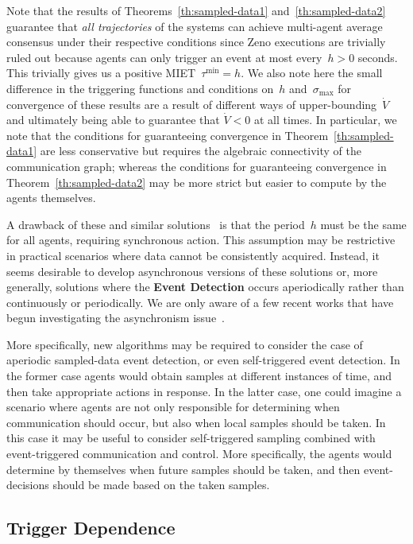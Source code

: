 \documentclass{autart}
\newcommand{\changes}[1]{{\color{blue} #1}}
\renewcommand{\changes}[1]{#1}
\begin{document}
Note that the results of Theorems~\ref{th:sampled-data1}
and~\ref{th:sampled-data2} guarantee that \emph{all trajectories} of
the systems can achieve multi-agent average consensus under their
respective conditions since Zeno executions are trivially ruled out
because agents can only trigger an event at most every~$h > 0$
seconds. \changes{This trivially gives us a positive MIET~$\tau^\text{min} = h$.}	
We also note here the small difference in the triggering
functions and conditions on~$h$ and~$\sigma_\text{max}$ for
convergence of these results are a result of different ways of
upper-bounding~$\dot{V}$ and ultimately being able to guarantee that
$\dot{V} < 0$ at all times. In particular, we note that the conditions
for guaranteeing convergence in Theorem~\ref{th:sampled-data1} are
less conservative but requires the algebraic connectivity of the
communication graph; whereas the conditions for guaranteeing
convergence in Theorem~\ref{th:sampled-data2} may be more strict but
easier to compute by the agents themselves.

A drawback of these and similar
solutions~\citep{XM-LX-YCS-CN-GJP:15,YF-YY-YZ:16} is that the
period~$h$ must be the same for all agents, requiring synchronous
action. This assumption may be restrictive in practical scenarios
where data cannot be consistently acquired.  Instead, it seems
desirable to develop asynchronous versions of these solutions or, more
generally, solutions where the \textbf{Event Detection} occurs
aperiodically rather than continuously or periodically. We are only
aware of a few recent works that have begun investigating the
asynchronism issue~\citep{XM-LX-YCS:17,YL-CN-ZT-QL:17,GD-FX-LW:17,YL-CN-ZT-QL:17}.

More specifically, new algorithms may be required to consider the case
of aperiodic sampled-data event detection, or even self-triggered
event detection. In the former case agents would obtain samples at
different instances of time, and then take appropriate actions in
response. In the latter case, one could imagine a scenario where
agents are not only responsible for determining when communication
should occur, but also when local samples should be taken. In this
case it may be useful to consider self-triggered sampling combined
with event-triggered communication and control. More specifically, the
agents would determine by themselves when future samples should be
taken, and then event-decisions should be made based on the taken
samples.

\subsection{\textbf{Trigger Dependence}}\label{se:triggerdependence}
\end{document}

